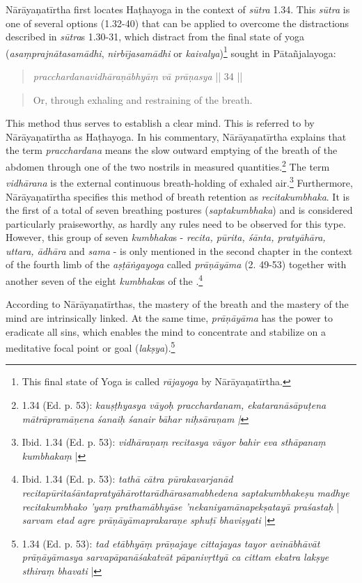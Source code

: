 Nārāyaṇatīrtha first locates Haṭhayoga in the context of \textit{sūtra} 1.34. This \textit{sūtra} is one of several options (1.32-40) that can be applied to overcome the distractions described in \textit{sūtra}s 1.30-31, which distract from the final state of yoga (\textit{asaṃprajnātasamādhi}, \textit{nirbījasamādhi} or \textit{kaivalya})\footnote{This final state of Yoga is called \textit{rājayoga} by Nārāyaṇatīrtha.} sought in Pātañjalayoga:
\begin{quote} \textit{pracchardanavidhāraṇābhyāṃ vā prāṇasya} || 34 || \end{quote}
\begin{quote} Or, through exhaling and restraining of the breath. \end{quote}

This method thus serves to establish a clear mind. This is referred to by Nārāyaṇatīrtha as Haṭhayoga. In his commentary, Nārāyaṇatīrtha explains that the term \textit{pracchardana} means the slow outward emptying of the breath of the abdomen through one of the two nostrils in measured quantities.\footnote{ 1.34 (Ed. p. 53): \textit{kauṣṭhyasya vāyoḥ pracchardanam, ekataranāsāpuṭena mātrāpramāṇena śanaiḥ śanair bāhar niḥsāraṇam |}} The term \textit{vidhārana} is the external continuous breath-holding of exhaled air.\footnote{Ibid. 1.34 (Ed. p. 53): \textit{vidhāraṇaṃ recitasya vāyor bahir eva sthāpanaṃ kumbhakaṃ} |} Furthermore, Nārāyaṇatīrtha specifies this method of breath retention as \textit{recitakumbhaka}. It is the first of a total of seven breathing postures (\textit{saptakumbhaka}) and is considered particularly praiseworthy, as hardly any rules need to be observed for this type. However, this group of seven \textit{kumbhaka}s - \textit{recita, pūrita, śānta, pratyāhāra, uttara, ādhāra} and \textit{sama} - is only mentioned in the second chapter in the context of the fourth limb of the \textit{aṣṭāṅgayoga} called \textit{prāṇāyāma} (2. 49-53) together with another seven of the eight \textit{kumbhaka}s of the .\footnote{Ibid. 1.34 (Ed. p. 53): \textit{tathā cātra pūrakavarjanād recitapūritaśāntapratyāhārottarādhārasamabhedena saptakumbhakeṣu madhye recitakumbhako 'yaṃ prathamābhyāse 'nekaniyamānapekṣatayā praśastaḥ} | \textit{sarvam etad agre prāṇāyāmaprakaraṇe sphuṭī bhaviṣyati} |}

According to Nārāyaṇatīrthas, the mastery of the breath and the mastery of the mind are intrinsically linked. At the same time, \textit{prāṇāyāma} has the power to eradicate all sins, which enables the mind to concentrate and stabilize on a meditative focal point or goal (\textit{lakṣya}).\footnote{ 1.34 (Ed. p. 53): \textit{tad etābhyāṃ prāṇajaye cittajayas tayor avinābhāvāt prāṇāyāmasya sarvapāpanāśakatvāt pāpanivṛttyā ca cittam ekatra lakṣye sthiraṃ bhavati} |}

